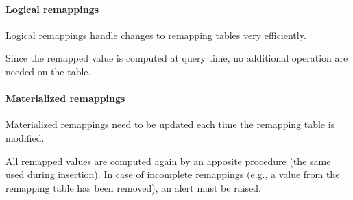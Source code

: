     \paragraph{Logical remappings}
        Logical remappings handle changes to remapping tables very efficiently.
        
        Since the remapped value is computed at query time, no additional operation are needed on the table.
        
    \paragraph{Materialized remappings}
        Materialized remappings need to be updated each time the remapping table is modified.
        
        All remapped values are computed again by an apposite procedure (the same used during insertion).
        In case of incomplete remappings (e.g., a value from the remapping table has been removed), an alert must be raised.